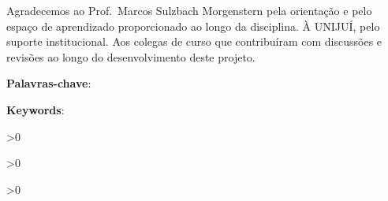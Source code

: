 \documentclass[
    12pt,
    oneside,
    a4paper,
    chapter=TITLE,
    section=TITLE,
    english,
    brazil
]{abntex2}
\begin{document}
\frenchspacing

\pretextual

\imprimircapa
\imprimirfolhaderosto

\begin{agradecimentos}
Agradecemos ao Prof.\  Marcos Sulzbach Morgenstern pela orientação e pelo espaço
de aprendizado proporcionado ao longo da disciplina. À UNIJUÍ, pelo suporte
institucional. Aos colegas de curso que contribuíram com discussões e revisões
ao longo do desenvolvimento deste projeto.
\end{agradecimentos}

\begin{resumo}
    \imprimirresumo
    \par
    \noindent \textbf{Palavras-chave}: \imprimirpalavraschave
\end{resumo}

\begin{resumo}[Abstract]
    \imprimirabstract
    \par
    \noindent \textbf{Keywords}: \imprimirkeywords
\end{resumo}

\ifnum{}>0
    \listoffigures*
    \cleardoublepage
\fi

\ifnum{}>0
    \listofquadros*
    \cleardoublepage
\fi

\ifnum{}>0
    \listoftables*
    \cleardoublepage
\fi
\end{document}
